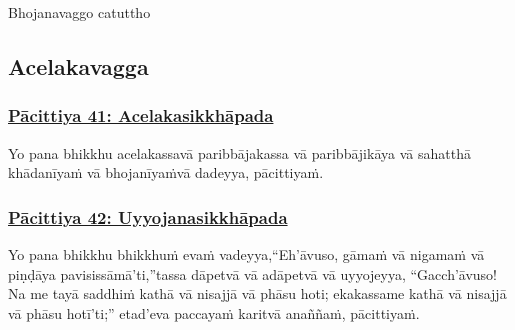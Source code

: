 \begin{center}
	Bhojanavaggo catuttho
\end{center}



\subsection{Acelakavagga}

\subsubsection*{\hyperref[exp41]{Pācittiya 41: Acelakasikkhāpada}}
\label{pac41}

Yo pana bhikkhu acelakassa\makeatletter\hyperlink{endnote309-appendix}\makeatother \thinspace vā paribbājakassa vā paribbājikāya vā sahatthā khādanīyaṁ vā bhojanīyaṁ\makeatletter\hyperlink{endnote310-appendix}\makeatother \thinspace vā dadeyya, pācittiyaṁ.



\subsubsection*{\hyperref[exp42]{Pācittiya 42: Uyyojanasikkhāpada}}
\label{pac42}

Yo pana bhikkhu bhikkhuṁ evaṁ vadeyya,\makeatletter\hyperlink{endnote311-appendix}\makeatother \thinspace ``Eh'āvuso, gāmaṁ vā nigamaṁ vā piṇḍāya pavisissāmā'ti,''\makeatletter\hyperlink{endnote312-appendix}\makeatother \thinspace tassa dāpetvā vā adāpetvā vā uyyojeyya, ``Gacch'āvuso! Na me tayā saddhiṁ kathā vā nisajjā vā phāsu hoti; ekakassa\makeatletter\hyperlink{endnote313-appendix}\makeatother \thinspace me kathā vā nisajjā vā phāsu hotī'ti;'' etad'eva paccayaṁ karitvā anaññaṁ, pācittiyaṁ.



